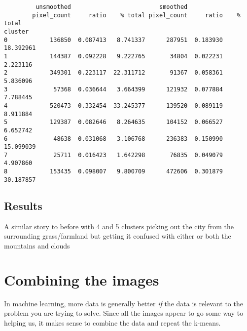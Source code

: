 \documentclass[11pt]{article}
\begin{document}
    
    \begin{verbatim}
         unsmoothed                         smoothed                     
        pixel_count     ratio    % total pixel_count     ratio    % total
cluster                                                                  
0            136850  0.087413   8.741337      287951  0.183930  18.392961
1            144387  0.092228   9.222765       34804  0.022231   2.223116
2            349301  0.223117  22.311712       91367  0.058361   5.836096
3             57368  0.036644   3.664399      121932  0.077884   7.788445
4            520473  0.332454  33.245377      139520  0.089119   8.911884
5            129387  0.082646   8.264635      104152  0.066527   6.652742
6             48638  0.031068   3.106768      236383  0.150990  15.099039
7             25711  0.016423   1.642298       76835  0.049079   4.907860
8            153435  0.098007   9.800709      472606  0.301879  30.187857
    \end{verbatim}

    
    \subsection{Results}\label{results}

A similar story to before with 4 and 5 clusters picking out the city
from the surrounding grass/farmland but getting it confused with either
or both the mountains and clouds

    \section{Combining the images}\label{combining-the-images}

In machine learning, more data is generally better \emph{if} the data is
relevant to the problem you are trying to solve. Since all the images
appear to go some way to helping us, it makes sense to combine the data
and repeat the k-means.
\end{document}

